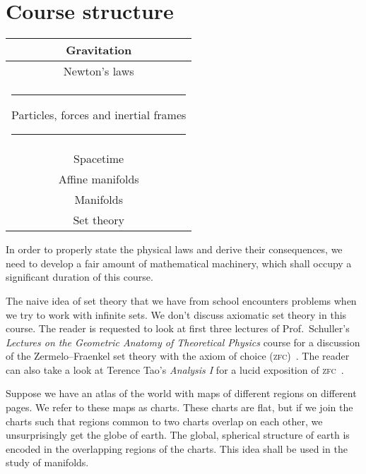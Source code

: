 \documentclass[a4 paper, 11pt]{book}
\theoremstyle{definition}
\begin{document}
    \section{Course structure}

    \begin{center}
        \renewcommand{\arraystretch}{1.3}
        \begin{tabular}{|c|}
            \hline
            Gravitation\\
            \hline
            Newton's laws\\
            \hline
            \rule{5pt}{0pt}Particles, forces and inertial frames\rule{5pt}{0pt}\\
            \hline
            Spacetime\\
            \hline
            Affine manifolds\\
            \hline
            Manifolds\\
            \hline
            Set theory\\
            \hline
        \end{tabular}
    \end{center}

    In order to properly state the physical laws and derive their consequences, we need to develop a fair amount of mathematical machinery, which shall occupy a significant duration of this course.

    The naive idea of set theory that we have from school encounters problems when we try to work with infinite sets. We don't discuss axiomatic set theory in this course. The reader is requested to look at first three lectures of Prof.\ Schuller's \textit{Lectures on the Geometric Anatomy of Theoretical Physics} course for a discussion of the Zermelo--Fraenkel set theory with the axiom of choice (\textsc{zfc})~\cite{Schuller_geometric_videos}. The reader can also take a look at Terence Tao's \textit{Analysis I} for a lucid exposition of \textsc{zfc}~\cite{Tao}.

    Suppose we have an atlas of the world with maps of different regions on different pages. We refer to these maps as charts. These charts are flat, but if we join the charts such that regions common to two charts overlap on each other, we unsurprisingly get the globe of earth. The global, spherical structure of earth is encoded in the overlapping regions of the charts. This idea shall be used in the study of manifolds.
\end{document}
